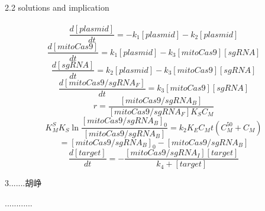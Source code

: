 \documentclass[UTF8]{ctexart}
\begin{document}
	\\\\
	{\Large 2.2 solutions and implication} 
	\\\\
	\begin{equation}
\frac{d[plasmid]}{dt}=-k_1[plasmid]-k_2[plasmid]\tag{1}
	\end{equation}
	\begin{equation}
	\frac{d[mitoCas9]}{dt}=k_1[plasmid]-k_3[mitoCas9][sgRNA]\tag{2}
	\end{equation}
	\begin{equation}
	\frac{d[sgRNA]}{dt}=k_2[plasmid]-k_3[mitoCas9][sgRNA]\tag{3}
	\end{equation}
	\begin{equation}
	\frac{d[mitoCas9/sgRNA_F]}{dt}=k_3[mitoCas9][sgRNA]\tag{4}
	\end{equation}
	\begin{equation}
    r=\frac{[mitoCas9/sgRNA_B]}{[mitoCas9/sgRNA_F]K_S C_M}\tag{5}
	\end{equation}
	\begin{equation}
	K_M^SK_S\ln\frac{[mitoCas9/sgRNA_B]_0}{[mitoCas9/sgRNA_B]}=k_2K_EC_Mt (C_M^{50}+C_M)\tag{6}
	\end{equation}
	\begin{equation}
    [mitoCas9/sgRNA_I]= [mitoCas9/sgRNA_B]_0-[mitoCas9/sgRNA_B]\tag{7}
	\end{equation}
	\begin{equation}
	\frac{d[target]}{dt}=-\frac{[mitoCas9/sgRNA_I][target]}{k_4+[target]}\tag{8}
	\end{equation}
	\begin{center}
	{\Large 3.......胡峥}
	\end{center}
............
\end{document}
